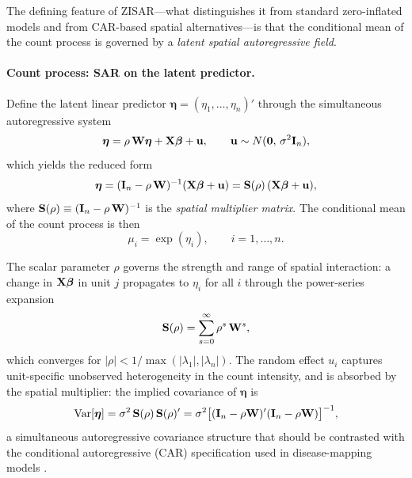 The defining feature of ZISAR---what distinguishes it from standard zero-inflated models and from CAR-based spatial alternatives---is that the conditional mean of the count process is governed by a \emph{latent spatial autoregressive field}.

\paragraph{Count process: SAR on the latent predictor.}
Define the latent linear predictor $\boldsymbol{\eta} = (\eta_1,\ldots,\eta_n)'$ through the simultaneous autoregressive system
\begin{equation}\label{eq:sar_eta}
  \boldsymbol{\eta} = \rho\,\mathbf{W}\boldsymbol{\eta} + \mathbf{X}\boldsymbol{\beta} + \mathbf{u}, \qquad \mathbf{u} \sim N(\mathbf{0},\,\sigma^2\mathbf{I}_n),
\end{equation}
which yields the reduced form
\begin{equation}\label{eq:reduced_form}
  \boldsymbol{\eta} = (\mathbf{I}_n - \rho\,\mathbf{W})^{-1}(\mathbf{X}\boldsymbol{\beta} + \mathbf{u}) = \mathbf{S}(\rho)\,(\mathbf{X}\boldsymbol{\beta} + \mathbf{u}),
\end{equation}
where $\mathbf{S}(\rho) \equiv (\mathbf{I}_n - \rho\,\mathbf{W})^{-1}$ is the \emph{spatial multiplier matrix}.
The conditional mean of the count process is then
\begin{equation}\label{eq:count_mean}
  \mu_i = \exp(\eta_i), \qquad i = 1,\ldots,n.
\end{equation}

The scalar parameter $\rho$ governs the strength and range of spatial interaction: a change in $\mathbf{X}\boldsymbol{\beta}$ in unit $j$ propagates to $\eta_i$ for all $i$ through the power-series expansion
\begin{equation}\label{eq:power_series}
  \mathbf{S}(\rho) = \sum_{s=0}^{\infty} \rho^s\,\mathbf{W}^s,
\end{equation}
which converges for $|\rho| < 1/\max(|\lambda_1|,|\lambda_n|)$.
The random effect $u_i$ captures unit-specific unobserved heterogeneity in the count intensity, and is absorbed by the spatial multiplier: the implied covariance of $\boldsymbol{\eta}$ is
\begin{equation}\label{eq:cov_eta}
  \mathrm{Var}[\boldsymbol{\eta}] = \sigma^2\,\mathbf{S}(\rho)\,\mathbf{S}(\rho)' = \sigma^2\bigl[(\mathbf{I}_n-\rho\mathbf{W})'(\mathbf{I}_n-\rho\mathbf{W})\bigr]^{-1},
\end{equation}
a simultaneous autoregressive covariance structure \citep{anselin1988} that should be contrasted with the conditional autoregressive (CAR) specification used in disease-mapping models \citep{besag_york_mollie1991,lee2013}.

